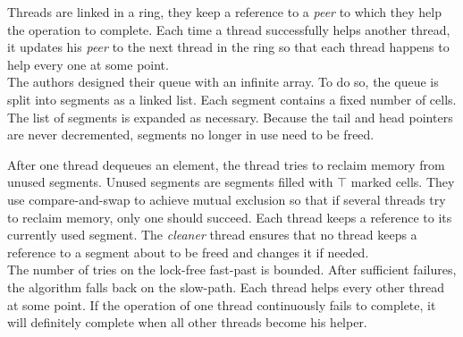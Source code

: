 Threads are linked in a ring, they keep a reference to a \textit{peer} to which
they help the operation to complete. Each time a thread successfully helps
another thread, it updates his \textit{peer} to the next thread in the ring so
that each
thread happens to help every one at some point. \\

 The authors designed their queue with an infinite
array. To do so, the queue is split into segments as a linked list. Each segment
contains a fixed number of cells. The list of segments is expanded as necessary.
Because the tail and head pointers are never decremented, segments no longer in
use need to be freed.

After one thread dequeues an element, the thread tries to reclaim memory from
unused segments. Unused segments are segments filled with $\top$ marked cells.
They use compare-and-swap to achieve mutual exclusion so that if several threads
try to reclaim memory, only one should succeed. Each thread keeps a reference to
its currently used segment. The \textit{cleaner} thread ensures that no thread
keeps a reference to a segment about to be freed and changes it
if needed. \\

 The number of tries on the lock-free fast-past is
bounded. After sufficient failures, the algorithm falls back on the slow-path.
Each thread helps every other thread at some point. If the operation of one
thread continuously fails to complete, it will definitely complete when all
other threads become his helper.
